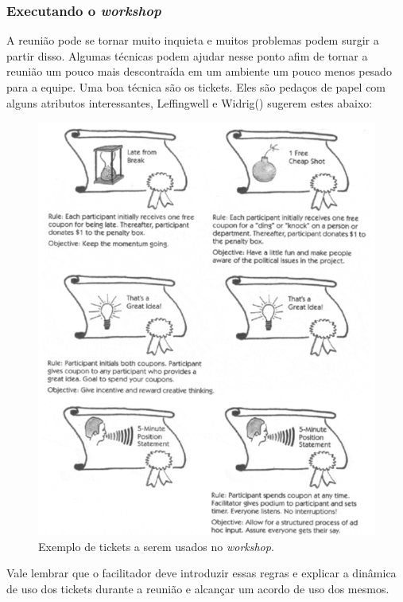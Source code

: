       \subsubsection{Executando o \textit{workshop}}
      
	A reunião pode se tornar muito inquieta e muitos problemas podem surgir a partir disso. 
	Algumas técnicas podem ajudar nesse ponto afim de tornar a reunião um pouco mais descontraída 
	em um ambiente um pouco menos pesado para a equipe. 
	Uma boa técnica são os tickets. Eles são pedaços de papel com alguns atributos interessantes, 
	Leffingwell e Widrig(\citeyear{leffingwell99}) sugerem estes abaixo:
	\begin{figure}[!htbp]
	  \centering
	  \includegraphics[scale=0.5]{editaveis/figuras/tickets}
	  \caption[Exemplo de tickets a serem usados no \textit{workshop}]
	    {Exemplo de tickets a serem usados no \textit{workshop}.\footnotemark}
	  \label{tickets}
	\end{figure}
	Vale lembrar que o facilitador deve introduzir essas regras e explicar a 
	dinâmica de uso dos tickets durante a reunião e alcançar um acordo de uso dos mesmos.
	
